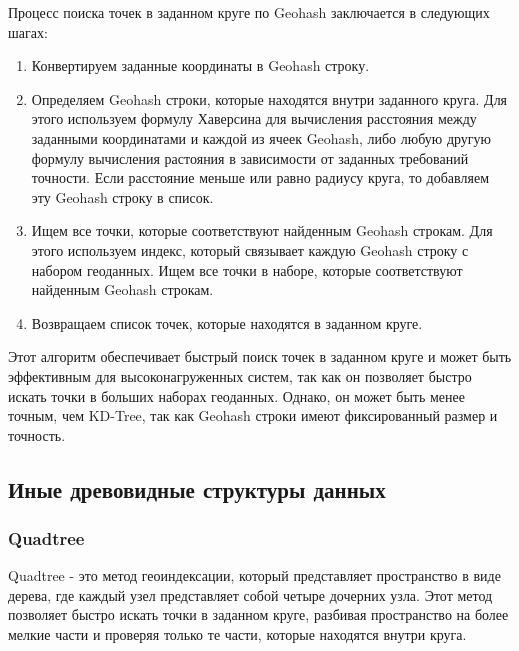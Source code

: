 Процесс поиска точек в заданном круге по Geohash заключается в следующих шагах:
\begin{enumerate}
    \item Конвертируем заданные координаты в Geohash строку.
    \item Определяем Geohash строки, которые находятся внутри заданного круга. Для этого используем формулу Хаверсина для вычисления расстояния между заданными координатами и каждой из ячеек Geohash, либо любую другую формулу вычисления растояния в зависимости от заданных требований точности. Если расстояние меньше или равно радиусу круга, то добавляем эту Geohash строку в список.
    \item Ищем все точки, которые соответствуют найденным Geohash строкам. Для этого используем индекс, который связывает каждую Geohash строку с набором геоданных. Ищем все точки в наборе, которые соответствуют найденным Geohash строкам.
    \item Возвращаем список точек, которые находятся в заданном круге.
\end{enumerate}

Этот алгоритм обеспечивает быстрый поиск точек в заданном круге и может быть эффективным для высоконагруженных систем, так как он позволяет быстро искать точки в больших наборах геоданных. Однако, он может быть менее точным, чем KD-Tree, так как Geohash строки имеют фиксированный размер и точность.

\subsection{Иные древовидные структуры данных}

\subsubsection{Quadtree}
Quadtree - это метод геоиндексации, который представляет пространство в виде дерева, где каждый узел представляет собой четыре дочерних узла. Этот метод позволяет быстро искать точки в заданном круге, разбивая пространство на более мелкие части и проверяя только те части, которые находятся внутри круга.

